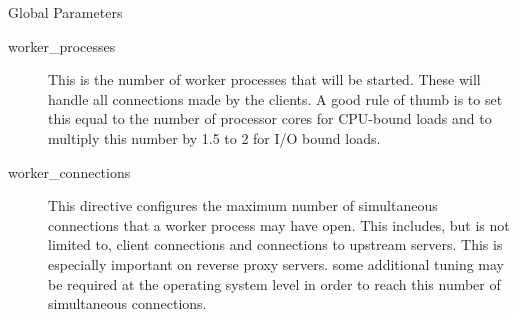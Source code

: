 \documentclass{beamer}
\begin{document}
\begin{frame}{Global Parameters}

\begin{description}
	\item[worker\_processes\cite{aivaliotis2016mastering}] This is the number of worker processes
that will be started. These will handle all connections made by the clients. A good rule of thumb is to set this equal to the number of processor cores for CPU-bound loads and to multiply this number by 1.5 to 2 for I/O bound loads.
	\item[worker\_connections] This directive configures the maximum number of simultaneous connections
that a worker process may have open. This includes, but is not limited to, client connections and connections to upstream servers. This is especially important on reverse proxy servers. some additional tuning may be required at the operating system level in order to reach this number of simultaneous connections.
\end{description}

\end{frame}

%
%	
\end{document}

